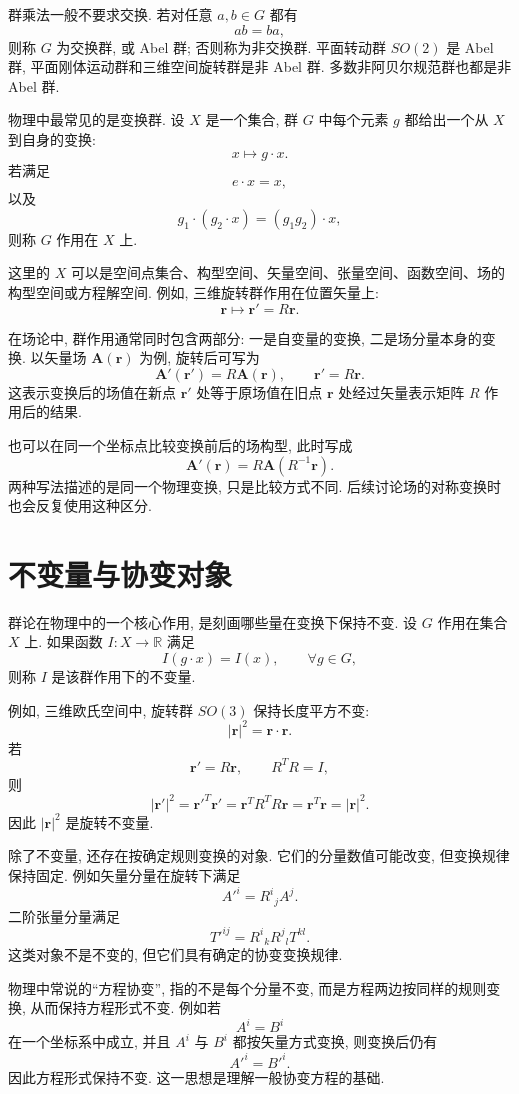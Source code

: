 群乘法一般不要求交换. 若对任意 $a,b\in G$ 都有
\[
ab=ba,
\]
则称 $G$ 为交换群, 或 Abel 群; 否则称为非交换群. 平面转动群 $SO(2)$ 是 Abel 群, 平面刚体运动群和三维空间旋转群是非 Abel 群. 多数非阿贝尔规范群也都是非 Abel 群. 

物理中最常见的是变换群. 设 $X$ 是一个集合, 群 $G$ 中每个元素 $g$ 都给出一个从 $X$ 到自身的变换:
\[
x\mapsto g\cdot x.
\]
若满足
\[
e\cdot x=x,
\]
以及
\[
g_1\cdot(g_2\cdot x)=(g_1g_2)\cdot x,
\]
则称 $G$ 作用在 $X$ 上. 

这里的 $X$ 可以是空间点集合、构型空间、矢量空间、张量空间、函数空间、场的构型空间或方程解空间. 例如, 三维旋转群作用在位置矢量上:
\[
\bm{r}\mapsto \bm{r}'=R\bm{r}.
\]

在场论中, 群作用通常同时包含两部分: 一是自变量的变换, 二是场分量本身的变换. 以矢量场 $\bm{A}(\bm{r})$ 为例, 旋转后可写为
\[
\bm{A}'(\bm{r}')=R\bm{A}(\bm{r}),
\qquad
\bm{r}'=R\bm{r}.
\]
这表示变换后的场值在新点 $\bm{r}'$ 处等于原场值在旧点 $\bm{r}$ 处经过矢量表示矩阵 $R$ 作用后的结果. 

也可以在同一个坐标点比较变换前后的场构型, 此时写成
\[
\bm{A}'(\bm{r})=R\bm{A}(R^{-1}\bm{r}).
\]
两种写法描述的是同一个物理变换, 只是比较方式不同. 后续讨论场的对称变换时也会反复使用这种区分. 

\section{不变量与协变对象}

群论在物理中的一个核心作用, 是刻画哪些量在变换下保持不变. 设 $G$ 作用在集合 $X$ 上. 如果函数 $I:X\to\mathbb{R}$ 满足
\[
I(g\cdot x)=I(x),
\qquad
\forall g\in G,
\]
则称 $I$ 是该群作用下的不变量. 

例如, 三维欧氏空间中, 旋转群 $SO(3)$ 保持长度平方不变: 
\[
|\bm{r}|^2=\bm{r}\cdot\bm{r}.
\]
若
\[
\bm{r}'=R\bm{r},
\qquad
R^TR=I,
\]
则
\[
|\bm{r}'|^2
=
\bm{r}'^T\bm{r}'
=
\bm{r}^TR^TR\bm{r}
=
\bm{r}^T\bm{r}
=
|\bm{r}|^2.
\]
因此 $|\bm{r}|^2$ 是旋转不变量. 

除了不变量, 还存在按确定规则变换的对象. 它们的分量数值可能改变, 但变换规律保持固定. 例如矢量分量在旋转下满足
\[
A'^i=R^i{}_jA^j.
\]
二阶张量分量满足
\[
T'^{ij}=R^i{}_kR^j{}_lT^{kl}.
\]
这类对象不是不变的, 但它们具有确定的协变变换规律. 

物理中常说的“方程协变”, 指的不是每个分量不变, 而是方程两边按同样的规则变换, 从而保持方程形式不变. 例如若
\[
A^i=B^i
\]
在一个坐标系中成立, 并且 $A^i$ 与 $B^i$ 都按矢量方式变换, 则变换后仍有
\[
A'^i=B'^i.
\]
因此方程形式保持不变. 这一思想是理解一般协变方程的基础. 

